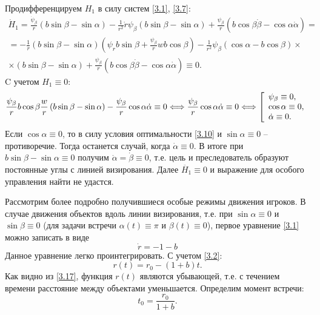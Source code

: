 \documentclass[a4paper,12pt, openany]{book}
\theoremstyle{plain} %
\theoremstyle{definition} %
\theoremstyle{remark} %
\numberwithin{equation}{chapter}
\begin{document}
{Продифференцируем $H_1$ в силу систем \eqref{3.1}, \eqref{3.7}:
\begin{multline*}
\dot H_1  = \frac{{\dot \psi _\beta  }}{r}\left( {b\sin \beta  - \sin \alpha } \right) - \frac{1}{{r^2 }}\dot r\psi _\beta  \left( {b\sin \beta  - \sin \alpha } \right) + \frac{{\psi _\beta  }}{r}\left( {b\cos \beta \dot \beta  - \cos \alpha \dot \alpha } \right) = \\
 =  - \frac{1}{r}\left( {b\sin \beta  - \sin \alpha } \right)\left( {\psi _r b\sin \beta  + \frac{{\psi _\beta  }}{r}wb\cos \beta } \right) - \frac{1}{{r^2 }}\psi _\beta  \left( {\cos \alpha  - b\cos \beta } \right) \times  \\
 \times \left( {b\sin \beta  - \sin \alpha } \right) + \frac{{\psi _\beta  }}{r}\left( {b\cos \beta \dot \beta  - \cos \alpha \dot \alpha } \right) \equiv 0. 
\end{multline*}
C учетом $H_1 \equiv 0$:
\[
\frac{{\psi _\beta  }}{r}b\cos \beta \frac{w}{r}\left( {b\sin \beta  - \sin \alpha } \right) - \frac{{\psi _\beta  }}{r}\cos \alpha \dot \alpha  \equiv 0 \Longleftrightarrow \frac{{\psi _\beta  }}{r}\cos \alpha \dot \alpha  \equiv 0 \Longleftrightarrow \left[ {\begin{array}{*{20}l}
   {\psi _\beta   \equiv 0,}  \\
   {\cos \alpha  \equiv 0,}  \\
   {\dot \alpha  \equiv 0.}  \\
\end{array}} \right.
\]
Если $\cos\alpha \equiv 0$, то в силу условия оптимальности \eqref{3.10} и $\sin\alpha \equiv 0$ -- противоречие. Тогда останется случай, когда $\dot\alpha \equiv 0$. В итоге при $b\sin\beta - \sin\alpha \equiv 0$ получим $\dot\alpha = \dot\beta \equiv 0$, т.е. цель и преследователь образуют постоянные углы с линией визирования. Далее $\ddot{H_1} \equiv 0$ и выражение для особого управления найти не удастся.

Рассмотрим более подробно получившиеся особые режимы движения игроков. В случае движения объектов вдоль линии визирования, т.е. при $\sin\alpha \equiv 0$ и $\sin\beta \equiv 0$ (для задачи встречи $\alpha(t) \equiv \pi$ и $\beta(t) \equiv 0$), первое уравнение \eqref{3.1} можно записать в виде
\begin{equation}\label{3.16}
\dot r =  - 1 - b
\end{equation}
Данное уравнение легко проинтегрировать. С учетом \eqref{3.2}: 
\begin{equation}\label{3.17}
r\left( t \right) = r_0  - \left( {1 + b} \right)t.
\end{equation}
Как видно из \eqref{3.17}, функция $r(t)$ являются убывающей, т.е. с течением времени расстояние между объектами уменьшается. Определим момент встречи:
\[
t_0  = \frac{{r_0 }}
{{1 + b}}.
\]

}
\end{document}
